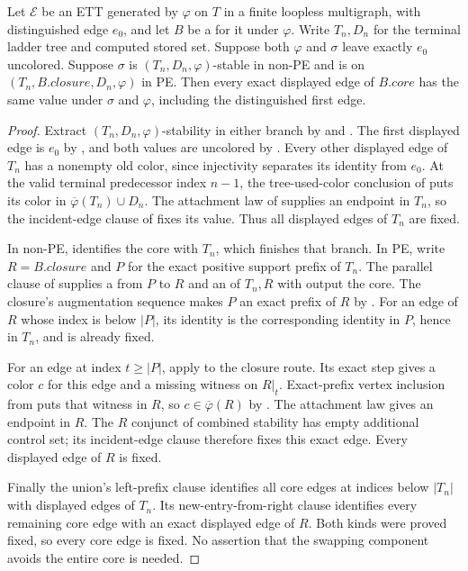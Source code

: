 \begin{helper}
Let $\mathcal E$ be an ETT generated by $\varphi$ on $T$ in a finite
loopless multigraph, with distinguished edge $e_0$, and let $B$ be a
 for it under $\varphi$.  Write $T_n,D_n$ for
the terminal ladder tree and computed stored set.  Suppose both
$\varphi$ and $\sigma$ leave exactly $e_0$ uncolored.  Suppose $\sigma$
is $(T_n,D_n,\varphi)$-stable in non-PE and is
 on $(T_n,B.\mathit{closure},D_n,\varphi)$
in PE.  Then every exact displayed edge of $B.\mathit{core}$ has the
same value under $\sigma$ and $\varphi$, including the distinguished
first edge.
\end{helper}
\begin{proof}
Extract $(T_n,D_n,\varphi)$-stability in either branch by
 and .
The first displayed edge is $e_0$ by , and both
values are uncolored by .
Every other displayed edge of $T_n$ has a nonempty old color, since
injectivity separates its identity from $e_0$.  At the valid terminal
predecessor index $n-1$, the tree-used-color conclusion of
 puts its color in
$\overline\varphi(T_n)\cup D_n$.  The attachment law of
 supplies an endpoint in $T_n$, so the incident-edge
clause of  fixes its value.  Thus all displayed
edges of $T_n$ are fixed.

In non-PE,  identifies the core with $T_n$,
which finishes that branch.  In PE, write $R=B.\mathit{closure}$ and
$P$ for the exact positive support prefix of $T_n$.
The parallel clause of  supplies a
 from $P$ to $R$ and an
 of $T_n,R$ with output the core.
The closure's augmentation sequence makes $P$ an exact prefix of $R$ by
.
For an edge of $R$ whose index is below $|P|$, its identity is the
corresponding identity in $P$, hence in $T_n$, and is already fixed.

For an edge at index $t\ge |P|$, apply
 to the closure route.
Its exact step gives a color $c$ for this edge and a missing witness
on $R|_t$.  Exact-prefix vertex inclusion from
 puts that witness
in $R$, so $c\in\overline\varphi(R)$ by .
The attachment law gives an endpoint in $R$.  The $R$ conjunct of
combined stability has empty additional control set; its incident-edge
clause therefore fixes this exact edge.  Every displayed edge of $R$
is fixed.

Finally the union's left-prefix clause identifies all core edges at
indices below $|T_n|$ with displayed edges of $T_n$.  Its
new-entry-from-right clause identifies every remaining core edge with
an exact displayed edge of $R$.  Both kinds were proved fixed, so every
core edge is fixed.  No assertion that the swapping component avoids
the entire core is needed.
\end{proof}

